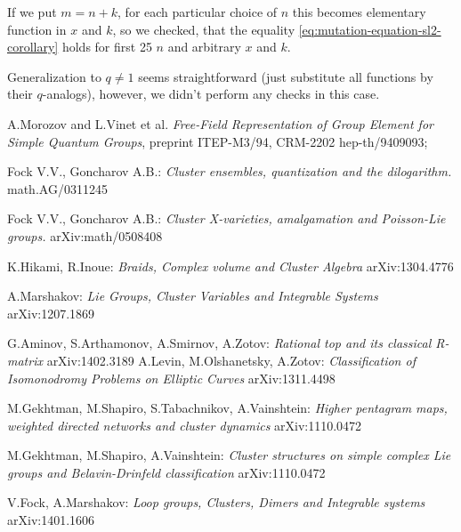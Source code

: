 \documentclass{article}
\newcommand {\?}{\textit{???}}
\begin{document}
If we put $m = n + k$, for each particular choice of $n$ this becomes elementary function in $x$ and $k$,
so we checked, that the equality \eqref{eq:mutation-equation-sl2-corollary} holds for first 25 $n$ and
arbitrary $x$ and $k$.

Generalization to $q \neq 1$ seems straightforward (just substitute all functions by their $q$-analogs),
however, we didn't perform any checks in this case.

\begin{thebibliography}{12}

A.Morozov and L.Vinet et al. {\it Free-Field Representation of Group Element for Simple Quantum Groups},
preprint ITEP-M3/94, CRM-2202 hep-th/9409093;

Fock V.V., Goncharov A.B.: {\it Cluster ensembles, quantization and the dilogarithm.}
math.AG/0311245

Fock V.V., Goncharov A.B.: {\it Cluster X-varieties, amalgamation and Poisson-Lie groups.}
arXiv:math/0508408

K.Hikami, R.Inoue: {\it Braids, Complex volume and Cluster Algebra}
arXiv:1304.4776

A.Marshakov: {\it Lie Groups, Cluster Variables and Integrable Systems}
arXiv:1207.1869

G.Aminov, S.Arthamonov, A.Smirnov, A.Zotov: {\it Rational top and its classical R-matrix}
arXiv:1402.3189
A.Levin, M.Olshanetsky, A.Zotov: {\it Classification of Isomonodromy Problems on Elliptic Curves}
arXiv:1311.4498

M.Gekhtman, M.Shapiro, S.Tabachnikov, A.Vainshtein: {\it Higher pentagram maps, weighted directed networks
and cluster dynamics}
arXiv:1110.0472

M.Gekhtman, M.Shapiro, A.Vainshtein: {\it Cluster structures on simple complex Lie groups and Belavin-Drinfeld
classification}
arXiv:1110.0472


V.Fock, A.Marshakov: {\it Loop groups, Clusters, Dimers and Integrable systems}
arXiv:1401.1606

\end{thebibliography}
\end{document}
